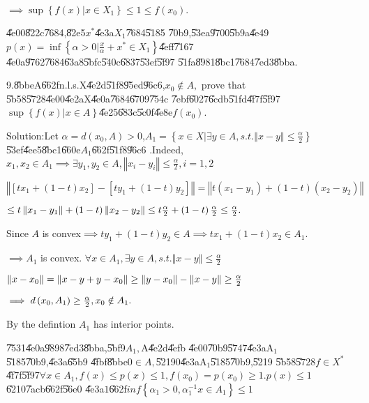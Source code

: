 \documentclass{article}
\begin{document}
$\implies \sup \left\{ f\left( x\right) |x\in X_{1}\right\} \leq 1\leq
f\left( x_{0}\right) .$

\U{4e00}\U{822c}\U{7684},\U{82e5}$x^{\ast }$\U{4e3a}$X_{1}$\U{7684}\U{5185}%
\U{70b9},\U{53ea}\U{9700}\U{5b9a}\U{4e49}$p\left( x\right) =\inf \left\{
\alpha >0|\frac{x}{\alpha }+x^{\ast }\in X_{1}\right\} $\U{4eff}\U{7167}%
\U{4e0a}\U{9762}\U{7684}\U{63a8}\U{5bfc}\U{540c}\U{6837}\U{53ef}\U{5f97}%
\U{51fa}\U{8981}\U{8bc1}\U{7684}\U{7ed3}\U{8bba}.

9.\U{8bbe}A\U{662f}n.l.s.X\U{4e2d}\U{51f8}\U{95ed}\U{96c6},$x_{0}\notin A,$%
prove that \U{5b58}\U{5728}\U{4e00}\U{4e2a}X\U{4e0a}\U{7684}\U{6709}\U{754c}%
\U{7ebf}\U{6027}\U{6cdb}\U{51fd}\U{4f7f}\U{5f97} $\sup \left\{ f\left(
x\right) |x\in A\right\} $\U{4e25}\U{683c}\U{5c0f}\U{4e8e}$f\left(
x_{0}\right) $.

Solution:Let $\alpha =d\left( x_{0},A\right) >0$,$A_{1}=\left\{ x\in
X|\exists y\in A,s.t.\left\Vert x-y\right\Vert \leq \frac{\alpha }{2}%
\right\} $\U{53ef}\U{4ee5}\U{8bc1}\U{660e}$A_{1}$\U{662f}\U{51f8}\U{96c6}%
.Indeed, $x_{1},x_{2}\in A_{1}\implies \exists y_{1},y_{2}\in A,\left\Vert
x_{i}-y_{i}\right\Vert \leq \frac{\alpha }{2},i=1,2$

$\left\Vert \left[ tx_{1}+\left( 1-t\right) x_{2}\right] -\left[
ty_{1}+\left( 1-t\right) y_{2}\right] \right\Vert =\left\Vert t\left(
x_{1}-y_{1}\right) +\left( 1-t\right) \left( x_{2}-y_{2}\right) \right\Vert $

$\leq t\left\Vert x_{1}-y_{1}\right\Vert +\left( 1-t\right) \left\Vert
x_{2}-y_{2}\right\Vert \leq t\frac{\alpha }{2}+\left( 1-t\right) \frac{%
\alpha }{2}\leq \frac{\alpha }{2}.$

Since $A$ is convex$\implies ty_{1}+\left( 1-t\right) y_{2}\in A\implies
tx_{1}+\left( 1-t\right) x_{2}\in A_{1}.$

$\implies A_{1}$ is convex. $\forall x\in A_{1},\exists y\in
A,s.t.\left\Vert x-y\right\Vert \leq \frac{\alpha }{2}$

$\left\Vert x-x_{0}\right\Vert =\left\Vert x-y+y-x_{0}\right\Vert \geq
\left\Vert y-x_{0}\right\Vert -\left\Vert x-y\right\Vert \geq \frac{\alpha }{%
2}$

$\bigskip \implies d\left( x_{0},A_{1}\right) \geq \frac{\alpha }{2}%
,x_{0}\notin A_{1}.$

By the defintion $A_{1}$ has interior points.

\U{7531}\U{4e0a}\U{9898}\U{7ed3}\U{8bba},\U{5bf9}$A_{1},$A\U{4e2d}\U{4efb}%
\U{4e00}\U{70b9}\U{5747}\U{4e3a}A$_{1}$\U{5185}\U{70b9},\U{4e3a}\U{65b9}%
\U{4fbf}\U{8bbe}0$\in A,$\U{5219}0\U{4e3a}A$_{1}$\U{5185}\U{70b9},\U{5219}%
\U{5b58}\U{5728}$f\in X^{\ast }$\U{4f7f}\U{5f97}$\forall x\in A_{1},f\left(
x\right) \leq p\left( x\right) \leq 1,f\left( x_{0}\right) =p\left(
x_{0}\right) \geq 1.p\left( x\right) \leq 1$\U{6210}\U{7acb}\U{662f}\U{56e0}%
\U{4e3a}$1$\U{662f}$inf\left\{ \alpha _{1}>0,\alpha _{1}^{-1}x\in
A_{1}\right\} \leq 1$
\end{document}
